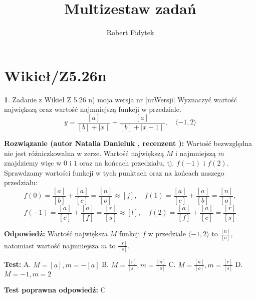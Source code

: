 \documentclass[12pt, a4paper]{article}
\title{Multizestaw zadań}
\author{Robert Fidytek}
\date{}
\theoremstyle{definition} %
\newtheorem{zad}{}
\newcommand{\kategoria}[1]{\section{#1}} %
\newcommand{\zadStart}[1]{\begin{zad}#1\newline} %
\newcommand{\zadStop}{\end{zad}}   %
\newcommand{\rozwStart}[2]{\noindent \textbf{Rozwiązanie (autor #1 , recenzent #2): }\newline} %
\newcommand{\rozwStop}{\newline}                                            %
\newcommand{\odpStart}{\noindent \textbf{Odpowiedź:}\newline}    %
\newcommand{\odpStop}{\newline}                                             %
\newcommand{\testStart}{\noindent \textbf{Test:}\newline} %
\newcommand{\testStop}{\newline} %
\newcommand{\kluczStart}{\noindent \textbf{Test poprawna odpowiedź:}\newline} %
\newcommand{\kluczStop}{\newline} %
\begin{document}
\maketitle

\kategoria{Wikieł/Z5.26n}

\zadStart{Zadanie z Wikieł Z 5.26 n) moja wersja nr [nrWersji]}
Wyznaczyć wartość największą oraz wartość najmniejszą funkcji w przedziale. 
$$y = \frac{[a]}{[b] + \mid x \mid} + \frac{[a]}{[b] + \mid x - 1 \mid}, \quad \langle -1,2 \rangle$$
\zadStop

\rozwStart{Natalia Danieluk}{}
Wartość bezwzględna nie jest różniczkowalna w zerze. Wartość największą $M$ i najmniejszą $m$ znajdziemy więc w $0$ i $1$ oraz na końcach przedziału, tj. $f(-1)$ i $f(2)$. \\
Sprawdzamy wartości funkcji w tych punktach oraz na końcach naszego przedziału: \\
$$ f(0) = \frac{[a]}{[b]} + \frac{[a]}{[c]} = \frac{[n]}{[o]} \approx [j], \quad f(1) = \frac{[a]}{[c]} + \frac{[a]}{[b]} = \frac{[n]}{[o]}, $$
$$ f(-1) = \frac{[a]}{[c]} + \frac{[a]}{[f]} = \frac{[r]}{[s]} \approx [l], \quad f(2) = \frac{[a]}{[f]} + \frac{[a]}{[c]} = \frac{[r]}{[s]} $$
\rozwStop

\odpStart
Wartość największa $M$ funkcji $f$ w przedziale $\langle -1,2 \rangle$ to $\frac{[n]}{[o]}$, natomiast wartość najmniejsza $m$ to $\frac{[r]}{[s]}$.
\odpStop

\testStart
A. $M=[a], m=-[a]$
B. $M=\frac{[r]}{[s]}, m=\frac{[n]}{[o]}$
C. $M=\frac{[n]}{[o]}, m=\frac{[r]}{[s]}$
D. $M=-1, m=2$
\testStop

\kluczStart
C
\kluczStop
\end{document}
